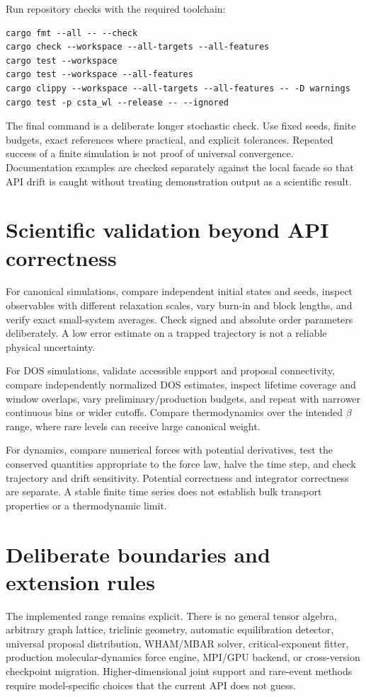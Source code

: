 \documentclass[11pt,a4paper,oneside]{report}
\begin{document}
Run repository checks with the required toolchain:
\par\noindent\begin{minipage}{\linewidth}
\begin{lstlisting}[caption={Workspace validation from the repository root.}]
cargo fmt --all -- --check
cargo check --workspace --all-targets --all-features
cargo test --workspace
cargo test --workspace --all-features
cargo clippy --workspace --all-targets --all-features -- -D warnings
cargo test -p csta_wl --release -- --ignored
\end{lstlisting}
\end{minipage}\par
The final command is a deliberate longer stochastic check. Use fixed seeds,
finite budgets, exact references where practical, and explicit tolerances.
Repeated success of a finite simulation is not proof of universal convergence.
Documentation examples are checked separately against the local facade so that
API drift is caught without treating demonstration output as a scientific result.

\section{Scientific validation beyond API correctness}
For canonical simulations, compare independent initial states and seeds, inspect
observables with different relaxation scales, vary burn-in and block lengths,
and verify exact small-system averages. Check signed and absolute order
parameters deliberately. A low error estimate on a trapped trajectory is not a
reliable physical uncertainty.

For DOS simulations, validate accessible support and proposal connectivity,
compare independently normalized DOS estimates, inspect lifetime coverage and
window overlaps, vary preliminary/production budgets, and repeat with narrower
continuous bins or wider cutoffs. Compare thermodynamics over the intended
$\beta$ range, where rare levels can receive large canonical weight.

For dynamics, compare numerical forces with potential derivatives, test the
conserved quantities appropriate to the force law, halve the time step, and
check trajectory and drift sensitivity. Potential correctness and integrator
correctness are separate. A stable finite time series does not establish bulk
transport properties or a thermodynamic limit.

\section{Deliberate boundaries and extension rules}
The implemented range remains explicit. There is no general tensor algebra,
arbitrary graph lattice, triclinic geometry, automatic equilibration detector,
universal proposal distribution, WHAM/MBAR solver, critical-exponent fitter,
production molecular-dynamics force engine, MPI/GPU backend, or cross-version
checkpoint migration. Higher-dimensional joint support and rare-event methods
require model-specific choices that the current API does not guess.
\end{document}
